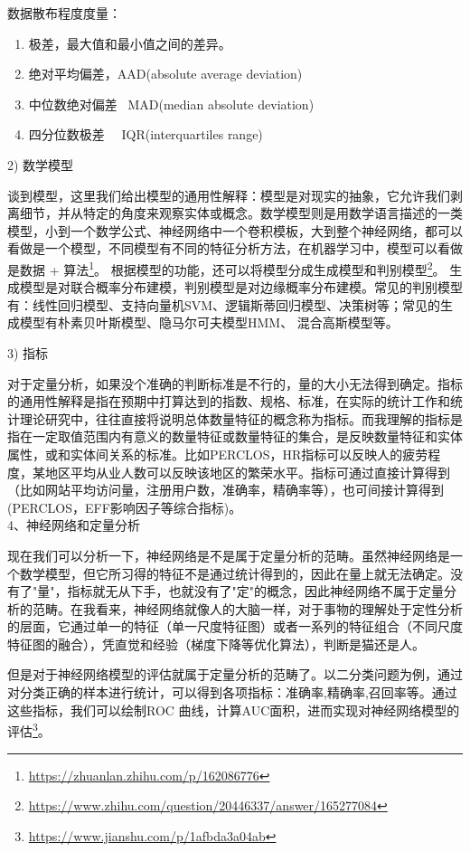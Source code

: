 数据散布程度度量：
\begin{enumerate}[label=\circled{\arabic*}]
    \item 极差，最大值和最小值之间的差异。
    \item 绝对平均偏差，AAD(absolute average deviation)
    \item 中位数绝对偏差  MAD(median absolute deviation)
    \item 四分位数极差   IQR(interquartiles range)
\end{enumerate}

2) 数学模型

谈到模型，这里我们给出模型的通用性解释：模型是对现实的抽象，它允许我们剥离细节，并从特定的角度来观察实体或概念。数学模型则是用数学语言描述的一类模型，小到一个数学公式、神经网络中一个卷积模板，大到整个神经网络，都可以看做是一个模型，不同模型有不同的特征分析方法，在机器学习中，模型可以看做是数据 + 算法\footnote{\url{https://zhuanlan.zhihu.com/p/162086776}}。 根据模型的功能，还可以将模型分成生成模型和判别模型\footnote{\url{https://www.zhihu.com/question/20446337/answer/165277084}}。 生成模型是对联合概率分布建模，判别模型是对边缘概率分布建模。常见的判别模型有：线性回归模型、支持向量机SVM、逻辑斯蒂回归模型、决策树等；常见的生成模型有朴素贝叶斯模型、隐马尔可夫模型HMM、 混合高斯模型等。

3) 指标

对于定量分析，如果没个准确的判断标准是不行的，量的大小无法得到确定。指标的通用性解释是指在预期中打算达到的指数、规格、标准，在实际的统计工作和统计理论研究中，往往直接将说明总体数量特征的概念称为指标。而我理解的指标是指在一定取值范围内有意义的数量特征或数量特征的集合，是反映数量特征和实体属性，或和实体间关系的标准。比如PERCLOS，HR指标可以反映人的疲劳程度，某地区平均从业人数可以反映该地区的繁荣水平。指标可通过直接计算得到（比如网站平均访问量，注册用户数，准确率，精确率等），也可间接计算得到(PERCLOS，EFF影响因子等综合指标)。\\

4、神经网络和定量分析

现在我们可以分析一下，神经网络是不是属于定量分析的范畴。虽然神经网络是一个数学模型，但它所习得的特征不是通过统计得到的，因此在量上就无法确定。没有了"量"，指标就无从下手，也就没有了"定"的概念，因此神经网络不属于定量分析的范畴。在我看来，神经网络就像人的大脑一样，对于事物的理解处于定性分析的层面，它通过单一的特征（单一尺度特征图）或者一系列的特征组合（不同尺度特征图的融合），凭直觉和经验（梯度下降等优化算法），判断是猫还是人。

但是对于神经网络模型的评估就属于定量分析的范畴了。以二分类问题为例，通过对分类正确的样本进行统计，可以得到各项指标：准确率,精确率,召回率等。通过这些指标，我们可以绘制ROC 曲线，计算AUC面积，进而实现对神经网络模型的评估\footnote{\url{https://www.jianshu.com/p/1afbda3a04ab}}。

